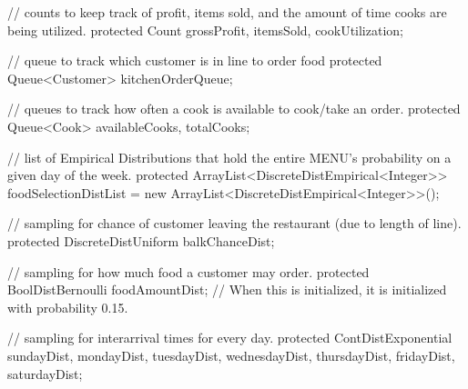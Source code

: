 \documentclass[11pt]{article}
\begin{document}
\begin{java}
	// counts to keep track of profit, items sold, and the amount of time cooks are being utilized.
	protected Count grossProfit, itemsSold, cookUtilization;

	// queue to track which customer is in line to order food
	protected Queue<Customer> kitchenOrderQueue;

	// queues to track how often a cook is available to cook/take an order.
	protected Queue<Cook> availableCooks, totalCooks;

	// list of Empirical Distributions that hold the entire MENU's probability on a given day of the week.
	protected ArrayList<DiscreteDistEmpirical<Integer>> foodSelectionDistList = new ArrayList<DiscreteDistEmpirical<Integer>>();

	// sampling for chance of customer leaving the restaurant (due to length of line).
	protected DiscreteDistUniform balkChanceDist;

	// sampling for how much food a customer may order.
	protected BoolDistBernoulli foodAmountDist; // When this is initialized, it is initialized with probability 0.15.

	// sampling for interarrival times for every day.
	protected ContDistExponential sundayDist, mondayDist, tuesdayDist, wednesdayDist, thursdayDist, fridayDist, saturdayDist;
\end{java}
\end{document}
